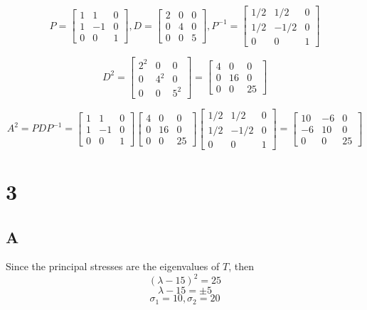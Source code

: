 \documentclass{article}
\begin{document}
\[P = \begin{bmatrix} 1 & 1 & 0 \\ 1 & -1 & 0 \\ 0 & 0 & 1 \end{bmatrix}, D = \begin{bmatrix} 2 & 0 & 0 \\ 0 & 4 & 0 \\ 0 & 0 & 5 \end{bmatrix}, P^{-1} = \begin{bmatrix} 1/2 & 1/2 & 0 \\ 1/2 & -1/2 & 0 \\ 0 & 0 & 1 \end{bmatrix}\]

\[D^2 = \begin{bmatrix} 2^2 & 0 & 0 \\ 0 & 4^2 & 0 \\ 0 & 0 & 5^2 \end{bmatrix} = \begin{bmatrix} 4 & 0 & 0 \\ 0 & 16 & 0 \\ 0 & 0 & 25 \end{bmatrix}\]

\[A^2 = PDP^{-1} = \begin{bmatrix} 1 & 1 & 0 \\ 1 & -1 & 0 \\ 0 & 0 & 1 \end{bmatrix} \begin{bmatrix} 4 & 0 & 0 \\ 0 & 16 & 0 \\ 0 & 0 & 25 \end{bmatrix} \begin{bmatrix} 1/2 & 1/2 & 0 \\ 1/2 & -1/2 & 0 \\ 0 & 0 & 1 \end{bmatrix} = \begin{bmatrix} 10 & -6 & 0 \\ -6 & 10 & 0 \\ 0 & 0 & 25 \end{bmatrix}\]

\section*{3}

\subsection*{A}
Since the principal stresses are the eigenvalues of \(T\), then
\[
	(\lambda - 15)^2 = 25
\]
\[
	\lambda - 15 = \pm 5
\]
\[
	\sigma_1 = 10, \sigma_2 = 20
\]
\end{document}

